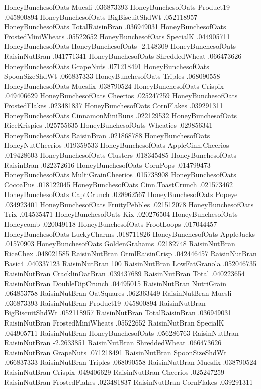 HoneyBunchesofOats	Muesli	.036873393
HoneyBunchesofOats	Product19	.045800894
HoneyBunchesofOats	BigBiscuitShdWt	.052118957
HoneyBunchesofOats	TotalRaisinBran	.036949031
HoneyBunchesofOats	FrostedMiniWheats	.05522652
HoneyBunchesofOats	SpecialK	.044905711
HoneyBunchesofOats	HoneyBunchesofOats	-2.148309
HoneyBunchesofOats	RaisinNutBran	.041771341
HoneyBunchesofOats	ShreddedWheat	.066473626
HoneyBunchesofOats	GrapeNuts	.071218491
HoneyBunchesofOats	SpoonSizeShdWt	.066837333
HoneyBunchesofOats	Triples	.068090558
HoneyBunchesofOats	Mueslix	.038790524
HoneyBunchesofOats	Crispix	.049406629
HoneyBunchesofOats	Cheerios	.025247259
HoneyBunchesofOats	FrostedFlakes	.023481837
HoneyBunchesofOats	CornFlakes	.039291311
HoneyBunchesofOats	CinnamonMiniBuns	.022129532
HoneyBunchesofOats	RiceKrispies	.025755635
HoneyBunchesofOats	Wheaties	.029856341
HoneyBunchesofOats	RaisinBran	.021868788
HoneyBunchesofOats	HoneyNutCheerios	.019359533
HoneyBunchesofOats	AppleCinn.Cheerios	.019428603
HoneyBunchesofOats	Clusters	.018345485
HoneyBunchesofOats	RaisinBran	.022372616
HoneyBunchesofOats	CornPops	.014799473
HoneyBunchesofOats	MultiGrainCheerios	.015738908
HoneyBunchesofOats	CocoaPus	.018122045
HoneyBunchesofOats	Cinn.ToastCrunch	.021573462
HoneyBunchesofOats	CaptCrunch	.028962567
HoneyBunchesofOats	Popeye	.034923401
HoneyBunchesofOats	FruityPebbles	.021512078
HoneyBunchesofOats	Trix	.014535471
HoneyBunchesofOats	Kix	.020276504
HoneyBunchesofOats	Honeycomb	.020049118
HoneyBunchesofOats	FrootLoops	.017044457
HoneyBunchesofOats	LuckyCharms	.018711826
HoneyBunchesofOats	AppleJacks	.01570903
HoneyBunchesofOats	GoldenGrahams	.02182748
RaisinNutBran	RiceChex	.048021585
RaisinNutBran	OtmlRaisinCrisp	.042446457
RaisinNutBran	Basic4	.040337123
RaisinNutBran	100%
RaisinNutBran	LowFatGranola	.052046735
RaisinNutBran	CracklinOatBran	.039437689
RaisinNutBran	Total	.040223654
RaisinNutBran	DoubleDipCrunch	.04495015
RaisinNutBran	NutriGrain	.064853758
RaisinNutBran	OatSquares	.062363449
RaisinNutBran	Muesli	.036873393
RaisinNutBran	Product19	.045800894
RaisinNutBran	BigBiscuitShdWt	.052118957
RaisinNutBran	TotalRaisinBran	.036949031
RaisinNutBran	FrostedMiniWheats	.05522652
RaisinNutBran	SpecialK	.044905711
RaisinNutBran	HoneyBunchesofOats	.056286763
RaisinNutBran	RaisinNutBran	-2.2633851
RaisinNutBran	ShreddedWheat	.066473626
RaisinNutBran	GrapeNuts	.071218491
RaisinNutBran	SpoonSizeShdWt	.066837333
RaisinNutBran	Triples	.068090558
RaisinNutBran	Mueslix	.038790524
RaisinNutBran	Crispix	.049406629
RaisinNutBran	Cheerios	.025247259
RaisinNutBran	FrostedFlakes	.023481837
RaisinNutBran	CornFlakes	.039291311
